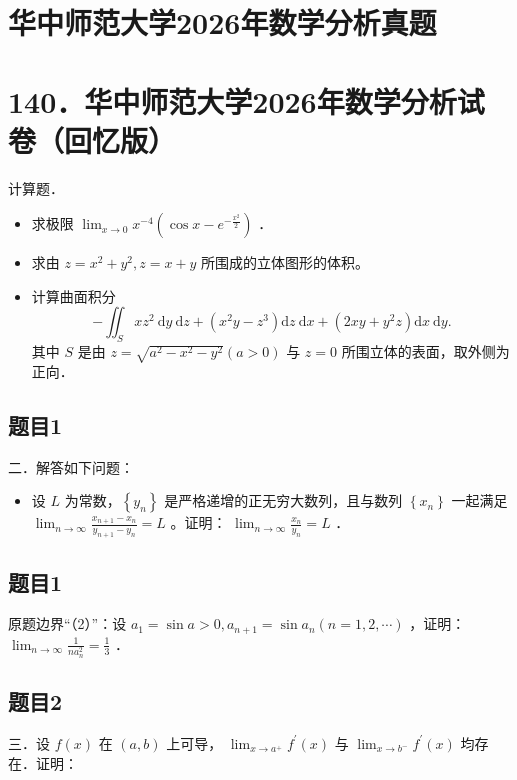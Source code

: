 \documentclass{article}
\begin{document}
\section*{华中师范大学2026年数学分析真题}
\section*{140．华中师范大学2026年数学分析试卷（回忆版）}
计算题．

\begin{itemize}
  \item[（1）] 求极限 \(\lim _{x \rightarrow 0} x^{-4}\left(\cos x-e^{-\frac{x^{2}}{2}}\right)\) ．
  \item[（2）] 求由 \(z=x^{2}+y^{2}, z=x+y\) 所围成的立体图形的体积。
  \item[（3）] 计算曲面积分
\[
-\iint_{S} x z^{2} \mathrm{~d} y \mathrm{~d} z+\left(x^{2} y-z^{3}\right) \mathrm{d} z \mathrm{~d} x+\left(2 x y+y^{2} z\right) \mathrm{d} x \mathrm{~d} y .
\]
其中 \(S\) 是由 \(z=\sqrt{a^{2}-x^{2}-y^{2}}(a>0)\) 与 \(z=0\) 所围立体的表面，取外侧为正向．
\end{itemize}

\subsection{题目1}
二．解答如下问题：

\begin{itemize}
  \item[（1）] 设 \(L\) 为常数，\(\left\{y_{n}\right\}\) 是严格递增的正无穷大数列，且与数列 \(\left\{x_{n}\right\}\) 一起满足 \(\lim _{n \rightarrow \infty} \frac{x_{n+1}-x_{n}}{y_{n+1}-y_{n}}=L\) 。证明： \(\lim _{n \rightarrow \infty} \frac{x_{n}}{y_{n}}=L\) ．
\end{itemize}

\subsection{题目1}
原题边界“（2）”：设 \(a_{1}=\sin a>0, a_{n+1}=\sin a_{n}(n=1,2, \cdots)\) ，证明： \(\lim _{n \rightarrow \infty} \frac{1}{n a_{n}^{2}}=\frac{1}{3}\) ．

\subsection{题目2}
三．设 \(f(x)\) 在 \((a, b)\) 上可导， \(\lim _{x \rightarrow a^{+}} f^{\prime}(x)\) 与 \(\lim _{x \rightarrow b^{-}} f^{\prime}(x)\) 均存在．证明：
\end{document}
